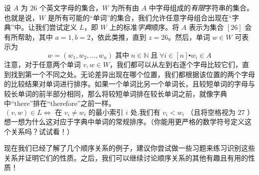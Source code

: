 \begin{example}
    设 $A$ 为 $26$ 个英文字母的集合，$W$ 为所有由 $A$ 中字母组成的\emph{有限}字符串的集合。也就是说，$W$ 是所有可能的``单词''的集合，我们允许任意字母组合出现在``字典''中。让我们尝试定义 $L$，即 $W$ 上的标准\emph{字典}顺序。将 $A$ 表示为集合 $[26]$ 会有所帮助，其中 $a = 1, b = 2$，依此类推，直到 $z = 26$。然后，单词 $w \in W$ 可表示为
    \[w = (w_1, w_2, \dots , w_n) \;\text{其中}\; n \in \mathbb{N} \;\text{且}\; \forall i \in [n] \centerdot w_i \in A\]
    注意，对于任意两个单词 $v, w \in W$，我们都可以从左到右逐个字母比较它们，直到找到第一个不同之处。无论差异出现在哪个位置，我们都根据该位置的两个字母的比较结果对单词进行排序。如果一个单词比另一个单词长，且较短单词的字母与较长单词的前半部分相同，那么将较短单词排在较长单词之前，就像字典中``there''排在``therefore''之前一样。
    \[(v, w) \in L \iff \text{\ 在\ } v_i \ne w_i \text{\ 的最小索引\ } i \text{\ 处,我们有\ } v_i < w_i \text{\ （且将空格视为\ } 27 \text{\ ）}\]
    想一想为什么这对应于字典中单词的常规排序。（你能用更严格的数学符号定义这个关系吗？试试看！）
\end{example}

现在我们已经了解了几个顺序关系的例子，建议你尝试做一些习题来练习识别这些关系并证明它们的性质。之后，我们可以继续讨论顺序关系的其他有趣且有用的性质！

